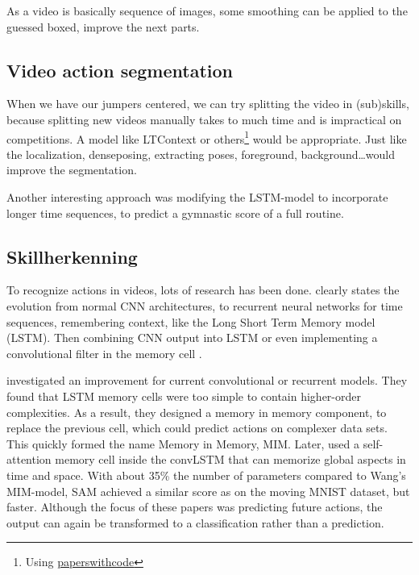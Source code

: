 As a video is basically sequence of images, some smoothing can be applied to the guessed boxed, improve the next parts.

\subsection{Video action segmentation}

When we have our jumpers centered, we can try splitting the video in (sub)skills, because splitting new videos manually takes to much time and is impractical on competitions.
A model like LTContext \textcite{Jiaming_2023} or others\footnote{Using \href{https://paperswithcode.com/task/action-segmentation}{paperswithcode}} would be appropriate. 
Just like the localization, denseposing, extracting poses, foreground, background\dots would improve the segmentation.

Another interesting approach was \textcite{Zahan_2023} modifying the LSTM-model to incorporate longer time sequences, to predict a gymnastic score of a full routine.

\subsection{Skillherkenning}
\label{subsec:skillherkenning}

To recognize actions in videos, lots of research has been done. %
\textcite{Yin_2024} clearly states the evolution from normal CNN architectures, to recurrent neural networks for time sequences, remembering context, like the Long Short Term Memory model (LSTM). Then combining CNN output into LSTM or even implementing a convolutional filter in the memory cell \autocite{Shi_2015}.

\textcite{Wang_2019} investigated an improvement for current convolutional or recurrent models. They found that LSTM memory cells were too simple to contain higher-order complexities. As a result, they designed a memory in memory component, to replace the previous cell, which could predict actions on complexer data sets. This quickly formed the name Memory in Memory, MIM. Later, \textcite{Lin_2020} used
a self-attention memory cell inside the convLSTM that can memorize global aspects in time and space. With about 35\% the number of parameters compared to Wang's MIM-model, SAM achieved a similar score as on the moving MNIST dataset, but faster. Although the focus of these papers was predicting future actions, the output can again be transformed to a classification rather than a prediction.

